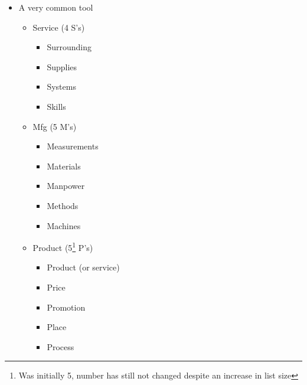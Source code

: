 \begin{itemize}
  \item A very common tool

    \begin{itemize}

      \item Service (4 S's)

        \begin{itemize}

          \item Surrounding

          \item Supplies

          \item Systems

          \item Skills

        \end{itemize}

      \item Mfg (5 M's)

        \begin{itemize}

          \item Measurements

          \item Materials

          \item Manpower

          \item Methods

          \item Machines

        \end{itemize}

      \item Product (5\footnote{Was initially 5, number has still not changed despite an increase in list size} P's)

        \begin{itemize}

          \item Product (or service)

          \item Price

          \item Promotion

          \item Place

          \item Process
            

\end{itemize}
\end{itemize}
\end{itemize}
